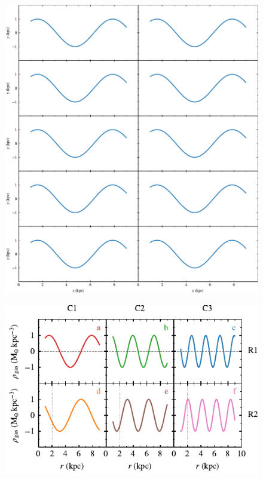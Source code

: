 \documentclass[usenatbib]{mnras}
\begin{document}
\begin{figure}
\includegraphics{../pdf/004.pdf}
\caption[]{\lipsum[66]}
\label{fig004}
\end{figure}

\lipsum[1-3]

\begin{figure}
\includegraphics{../pdf/005.pdf}
\caption[]{\lipsum[66]}
\label{fig005}
\end{figure}
\end{document}
